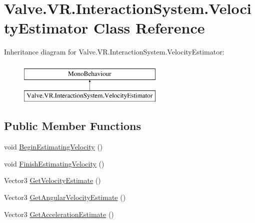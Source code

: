 \hypertarget{class_valve_1_1_v_r_1_1_interaction_system_1_1_velocity_estimator}{}\section{Valve.\+V\+R.\+Interaction\+System.\+Velocity\+Estimator Class Reference}
\label{class_valve_1_1_v_r_1_1_interaction_system_1_1_velocity_estimator}
Inheritance diagram for Valve.\+V\+R.\+Interaction\+System.\+Velocity\+Estimator\+:\begin{figure}[H]
\begin{center}
\leavevmode
\includegraphics[height=2.000000cm]{class_valve_1_1_v_r_1_1_interaction_system_1_1_velocity_estimator}
\end{center}
\end{figure}
\subsection*{Public Member Functions}
\begin{DoxyCompactItemize}
\item 
void \mbox{\hyperlink{class_valve_1_1_v_r_1_1_interaction_system_1_1_velocity_estimator_a7e6e08f723805cc2837f9e90aa8d583d}{Begin\+Estimating\+Velocity}} ()
\item 
void \mbox{\hyperlink{class_valve_1_1_v_r_1_1_interaction_system_1_1_velocity_estimator_aead319a66f9f5153e29b1979aa29c829}{Finish\+Estimating\+Velocity}} ()
\item 
Vector3 \mbox{\hyperlink{class_valve_1_1_v_r_1_1_interaction_system_1_1_velocity_estimator_a559516108b17223f0ed8de71e52e8d49}{Get\+Velocity\+Estimate}} ()
\item 
Vector3 \mbox{\hyperlink{class_valve_1_1_v_r_1_1_interaction_system_1_1_velocity_estimator_a83bd0335b0f4ac8f17d93403f9339026}{Get\+Angular\+Velocity\+Estimate}} ()
\item 
Vector3 \mbox{\hyperlink{class_valve_1_1_v_r_1_1_interaction_system_1_1_velocity_estimator_ad8110ea3ac14d8687d55169587027003}{Get\+Acceleration\+Estimate}} ()
\end{DoxyCompactItemize}
